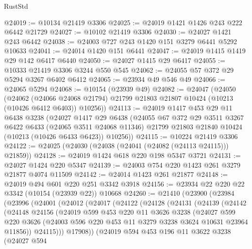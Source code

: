 \begin{lexlean}{RustStd}
\begin{coremodule}
{\begin{coremodule}
{{{{{{{{{{{{{{{{{{{{{{{{{{@24019 := @10134 @21419 @3306
@24025 := @24019 @1421 @1426 @243 @222 @6442 @21729
@24027 := @10102 @21419 @3306
@24030 := @24027 @1421 @243 @6442
@24038 := @24003 @727 @243 @1420 @151 @3279 @6441 @5292 @10633
@24041 := @24014 @1420 @151 @6441
@24047 := @24019 @1415 @1419 @29 @142 @6417 @6440
@24050 := @24027 @1415 @29 @6417
@24055 := @10333 @21419 @3306 @3244 @550 @545
@24062 := @24055 @57 @372 @29 @5294 @3267 @6402 @6412
@24065 := @23934 @49 @546 @49
@24066 := @24065 @5294
@24068 := @10154 (@23939 @49)
@24082 := @24047
    (@24050
      (@24062
        (@24066 @24068 @21794)
        @21799
        @21803
        @21807
        @10424
        (@10213 (@10426 @6412 @6403))
        @10256))
@24113 := @24019
    @1417
    @453
    @29
    @11
    @6438
    @3238
    (@24027
      @1417
      @29
      @6438
      (@24055
        @67
        @372
        @29
        @3511
        @3267
        @6422
        @6433
        (@24065 @3511 @24068 @11346)
        @21799
        @21803
        @21840
        @10424
        (@10213 (@10426 @6433 @6423))
        @10256))
@24115 := @10224 @21419 @3306
@24122 := @24025 (@24030 (@24038 (@24041 (@24082 (@24113 @24115))) @21859))
@24128 := @24019 @1424 @618 @220 @198 @5347 @3721
@24131 := @24027 @1424 @220 @5347
@24139 := @24003 @754 @220 @1423 @261 @3279 @21877 @4074 @11509
@24142 := @24014 @1423 @261 @21877
@24148 := @24019 @494 @601 @220 @251 @3342 @3918
@24156 := @23934 @22 @220 @22 @3342 (@10154 (@23939 @22)) @10668
@24260 := @21410
    (@23900
      (@23984
        (@23996
          (@24001
            (@24012
              (@24017
                (@24122
                  (@24128
                    (@24131
                      (@24139
                        (@24142
                          (@24148
                            @24156
                            (@24019
                              @599
                              @453
                              @220
                              @11
                              @3626
                              @3238
                              (@24027
                                @599
                                @220
                                @3626
                                (@24003 @596 @220 @453 @11 @3279 @3238 @3624 @10631 @23964 @11856))
                              @24115)))
                        @17908))
                    (@24019
                      @594
                      @453
                      @196
                      @11
                      @3622
                      @3238
                      (@24027
                        @594
}}}}}}}}}}}}}}}}}}}}}}}}}}
\end{coremodule}}
\end{coremodule}
\end{lexlean}
